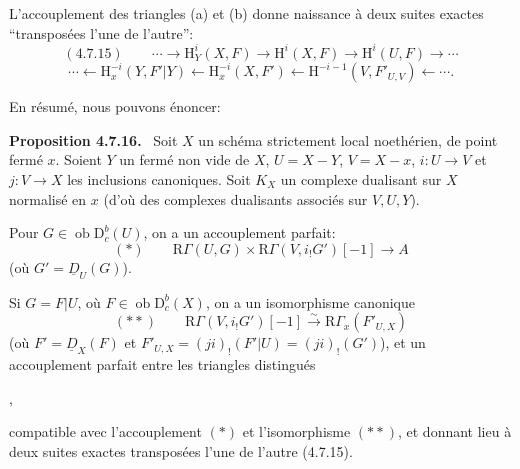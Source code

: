 \documentclass[11pt]{article}
\newenvironment{statement}[1]{\par\medskip\noindent\textbf{#1.}\ }{\par\medskip}
\renewcommand{\H}{\mathrm{H}}
\newcommand{\R}{\mathrm{R}}\newcommand{\RHomCore}{\mathrm{RHom}}
\newcommand{\D}{\mathrm{D}}
\newcommand{\ob}{\operatorname{ob}}
\providecommand{\ob}{\operatorname{ob}}
\providecommand{\R}{\mathrm R}
\begin{document}
L'accouplement des triangles (a) et (b) donne naissance à deux suites exactes ``transposées l'une de l'autre'':
\[
(4.7.15)\qquad \cdots\longrightarrow \H_Y^i(X,F)\longrightarrow\H^i(X,F)\longrightarrow\H^i(U,F)\longrightarrow\cdots
\]
\[
\cdots\longleftarrow \H_x^{-i}(Y,F'|Y)\longleftarrow\H_x^{-i}(X,F')\longleftarrow\H^{-i-1}(V,F'_{U,V})\longleftarrow\cdots.
\]

En résumé, nous pouvons énoncer:

\begin{statement}{Proposition 4.7.16}
Soit $X$ un schéma strictement local noethérien, de point fermé $x$. Soient $Y$ un fermé non vide de $X$, $U=X-Y$, $V=X-x$, $i:U\to V$ et $j:V\to X$ les inclusions canoniques. Soit $K_X$ un complexe dualisant sur $X$ normalisé en $x$ (d'où des complexes dualisants associés sur $V,U,Y$).

Pour $G\in\ob\D_c^b(U)$, on a un accouplement parfait:
\[
(*)\qquad \R\Gamma(U,G)\times\R\Gamma(V,i_!G')[-1]\longrightarrow A
\]
(où $G'=\underline{D}_U(G)$).

Si $G=F|U$, où $F\in\ob\D_c^b(X)$, on a un isomorphisme canonique
\[
(**)\qquad \R\Gamma(V,i_!G')[-1]\xrightarrow{\sim}\R\Gamma_x(F'_{U,X})
\]
(où $F'=\underline{D}_X(F)$ et $F'_{U,X}=(ji)_!(F'|U)=(ji)_!(G')$), et un accouplement parfait entre les triangles distingués
\begin{center}
\quad ,
\end{center}
compatible avec l'accouplement $(*)$ et l'isomorphisme $(**)$, et donnant lieu à deux suites exactes transposées l'une de l'autre (4.7.15).
\end{statement}
\end{document}
